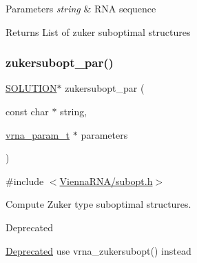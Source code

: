\begin{DoxyParams}{Parameters}
{\em string} & R\+NA sequence \\
\hline
\end{DoxyParams}
\begin{DoxyReturn}{Returns}
List of zuker suboptimal structures 
\end{DoxyReturn}
\mbox{\label{group__subopt__zuker_gab6d0ea8cc1d02f6dd831ca81043c9eb8}} 
\subsubsection{\texorpdfstring{zukersubopt\+\_\+par()}{zukersubopt\_par()}}
{\footnotesize\ttfamily \hyperlink{subopt_8h_aa0f46ff02e1017469cf902d02ecd7f9a}{S\+O\+L\+U\+T\+I\+ON}$\ast$ zukersubopt\+\_\+par (\begin{DoxyParamCaption}\item[{const char $\ast$}]{string,  }\item[{\hyperlink{group__energy__parameters_ga8a69ca7d787e4fd6079914f5343a1f35}{vrna\+\_\+param\+\_\+t} $\ast$}]{parameters }\end{DoxyParamCaption})}



{\ttfamily \#include $<$\hyperlink{subopt_8h}{Vienna\+R\+N\+A/subopt.\+h}$>$}



Compute Zuker type suboptimal structures. 

\begin{DoxyRefDesc}{Deprecated}
\item[\hyperlink{deprecated__deprecated000154}{Deprecated}]use vrna\+\_\+zukersubopt() instead\end{DoxyRefDesc}
